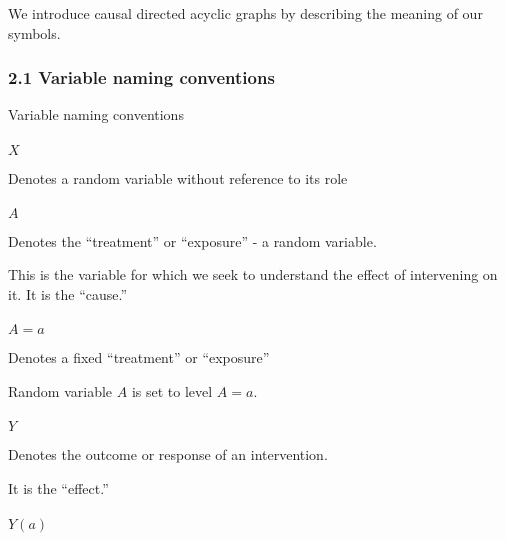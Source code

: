 \documentclass[
  single column]{article}
\makeatletter
\let\oldparagraph\paragraph
\renewcommand{\paragraph}{
    \@ifstar
      \xxxParagraphStar
      \xxxParagraphNoStar
  }
\newcommand{\xxxParagraphStar}[1]{\oldparagraph*{#1}\mbox{}}
\newcommand{\xxxParagraphNoStar}[1]{\oldparagraph{#1}\mbox{}}
\makeatother
\begin{document}
We introduce causal directed acyclic graphs by describing the meaning of
our symbols.

\subsubsection{2.1 Variable naming
conventions}\label{variable-naming-conventions}

\begin{table}

\caption{\label{tbl-terminology}Variable naming conventions}

\centering{

\terminologylocalconventionssimple

}

\end{table}%

\paragraph{\texorpdfstring{\(X\)}{X}}\label{x}

Denotes a random variable without reference to its role

\paragraph{\texorpdfstring{\(A\)}{A}}\label{a}

Denotes the ``treatment'' or ``exposure'' - a random variable.

This is the variable for which we seek to understand the effect of
intervening on it. It is the ``cause.''

\paragraph{\texorpdfstring{\(A=a\)}{A=a}}\label{aa}

Denotes a fixed ``treatment'' or ``exposure''

Random variable \(A\) is set to level \(A=a\).

\paragraph{\texorpdfstring{\(Y\)}{Y}}\label{y}

Denotes the outcome or response of an intervention.

It is the ``effect.''

\paragraph{\texorpdfstring{\(Y(a)\)}{Y(a)}}\label{ya}
\end{document}
